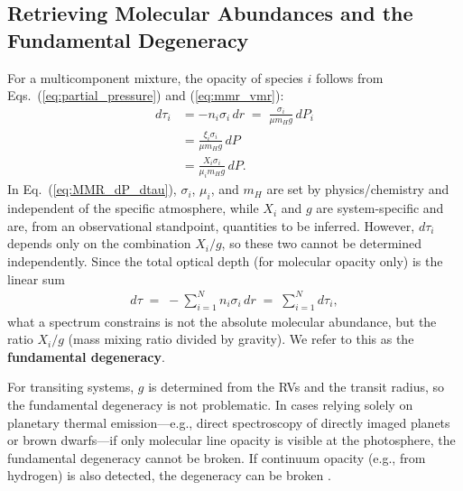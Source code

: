\subsection*{Retrieving Molecular Abundances and the Fundamental Degeneracy}

For a multicomponent mixture, the opacity of species $i$ follows from Eqs.~(\ref{eq:partial_pressure}) and (\ref{eq:mmr_vmr}):
\begin{align}
d \tau_i &= - n_i \sigma_i \, d r \;=\; \frac{\sigma_i}{\mu m_H g}\, d P_i \\
&= \frac{\xi_i \sigma_i}{\mu m_H g}\, d P  \\
\label{eq:MMR_dP_dtau}
&= \frac{X_i \sigma_i}{\mu_i m_H g}\, d P .
\end{align}
In Eq.~(\ref{eq:MMR_dP_dtau}), $\sigma_i$, $\mu_i$, and $m_H$ are set by physics/chemistry and independent of the specific atmosphere, while $X_i$ and $g$ are system-specific and are, from an observational standpoint, quantities to be inferred. However, $d\tau_i$ depends only on the combination $X_i/g$, so these two cannot be determined independently. Since the total optical depth (for molecular opacity only) is the linear sum
\begin{align}
\label{eq:mol}
d \tau \;=\; - \sum_{i=1}^N n_i \sigma_i \, d r \;=\; \sum_{i=1}^N d \tau_i ,
\end{align}
what a spectrum constrains is not the absolute molecular abundance, but the ratio $X_i/g$ (mass mixing ratio divided by gravity). We refer to this as the \textbf{fundamental degeneracy}.

For transiting systems, $g$ is determined from the RVs and the transit radius, so the fundamental degeneracy is not problematic. In cases relying solely on planetary thermal emission—e.g., direct spectroscopy of directly imaged planets or brown dwarfs—if only molecular line opacity is visible at the photosphere, the fundamental degeneracy cannot be broken. If continuum opacity (e.g., from hydrogen) is also detected, the degeneracy can be broken \cite{2025ApJ...988...53K}.
